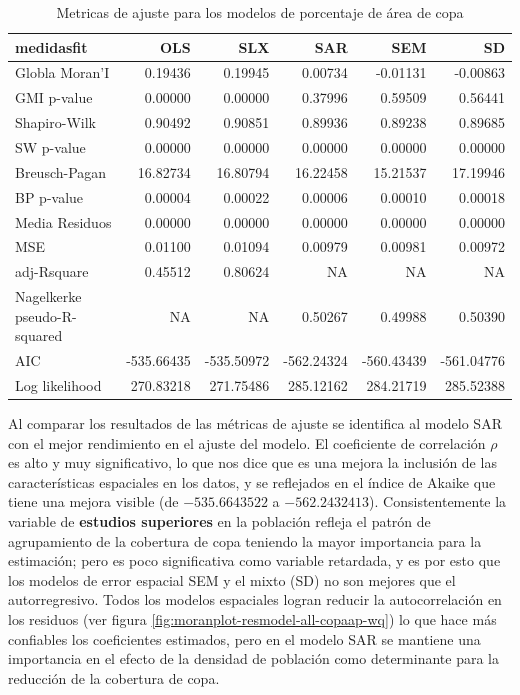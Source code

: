 \documentclass[12pt,]{book}
\begin{document}
\begin{table}

\caption{\label{tab:tabla-comp-modelos-copaap}Metricas de ajuste para los modelos de porcentaje de área de copa}
\centering
\begin{tabular}[t]{l|r|r|r|r|r}
\hline
medidasfit & OLS & SLX & SAR & SEM & SD\\
\hline
Globla Moran'I & 0.19436 & 0.19945 & 0.00734 & -0.01131 & -0.00863\\
\hline
GMI p-value & 0.00000 & 0.00000 & 0.37996 & 0.59509 & 0.56441\\
\hline
Shapiro-Wilk & 0.90492 & 0.90851 & 0.89936 & 0.89238 & 0.89685\\
\hline
SW p-value & 0.00000 & 0.00000 & 0.00000 & 0.00000 & 0.00000\\
\hline
Breusch-Pagan & 16.82734 & 16.80794 & 16.22458 & 15.21537 & 17.19946\\
\hline
BP p-value & 0.00004 & 0.00022 & 0.00006 & 0.00010 & 0.00018\\
\hline
Media Residuos & 0.00000 & 0.00000 & 0.00000 & 0.00000 & 0.00000\\
\hline
MSE & 0.01100 & 0.01094 & 0.00979 & 0.00981 & 0.00972\\
\hline
adj-Rsquare & 0.45512 & 0.80624 & NA & NA & NA\\
\hline
Nagelkerke pseudo-R-squared & NA & NA & 0.50267 & 0.49988 & 0.50390\\
\hline
AIC & -535.66435 & -535.50972 & -562.24324 & -560.43439 & -561.04776\\
\hline
Log likelihood & 270.83218 & 271.75486 & 285.12162 & 284.21719 & 285.52388\\
\hline
\end{tabular}
\end{table}

Al comparar los resultados de las métricas de ajuste se identifica al
modelo SAR con el mejor rendimiento en el ajuste del modelo. El
coeficiente de correlación \(\rho\) es alto y muy significativo, lo que
nos dice que es una mejora la inclusión de las características
espaciales en los datos, y se reflejados en el índice de Akaike que
tiene una mejora visible (de \(-535.6643522\) a \(-562.2432413\)).
Consistentemente la variable de \textbf{estudios superiores} en la
población refleja el patrón de agrupamiento de la cobertura de copa
teniendo la mayor importancia para la estimación; pero es poco
significativa como variable retardada, y es por esto que los modelos de
error espacial SEM y el mixto (SD) no son mejores que el autorregresivo.
Todos los modelos espaciales logran reducir la autocorrelación en los
residuos (ver figura \ref{fig:moranplot-resmodel-all-copaap-wq}) lo que
hace más confiables los coeficientes estimados, pero en el modelo SAR se
mantiene una importancia en el efecto de la densidad de población como
determinante para la reducción de la cobertura de copa.
\end{document}
